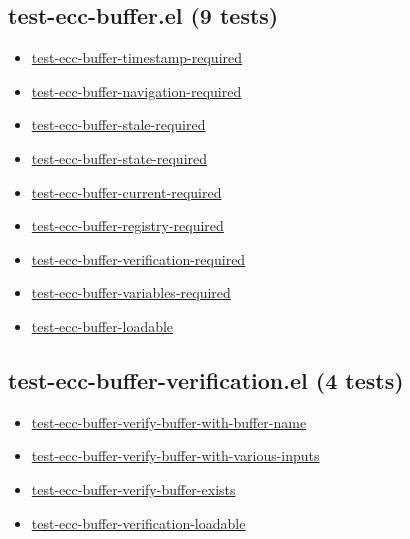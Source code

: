 \documentclass[11pt]{article}
\begin{document}
\subsection{test-ecc-buffer.el (9 tests)}
\label{sec:orgd9d5257}
\begin{itemize}
\item \href{test-ecc-buffer.el}{test-ecc-buffer-timestamp-required}
\item \href{test-ecc-buffer.el}{test-ecc-buffer-navigation-required}
\item \href{test-ecc-buffer.el}{test-ecc-buffer-stale-required}
\item \href{test-ecc-buffer.el}{test-ecc-buffer-state-required}
\item \href{test-ecc-buffer.el}{test-ecc-buffer-current-required}
\item \href{test-ecc-buffer.el}{test-ecc-buffer-registry-required}
\item \href{test-ecc-buffer.el}{test-ecc-buffer-verification-required}
\item \href{test-ecc-buffer.el}{test-ecc-buffer-variables-required}
\item \href{test-ecc-buffer.el}{test-ecc-buffer-loadable}
\end{itemize}
\subsection{test-ecc-buffer-verification.el (4 tests)}
\label{sec:orgd2758d4}
\begin{itemize}
\item \href{test-ecc-buffer-verification.el}{test-ecc-buffer-verify-buffer-with-buffer-name}
\item \href{test-ecc-buffer-verification.el}{test-ecc-buffer-verify-buffer-with-various-inputs}
\item \href{test-ecc-buffer-verification.el}{test-ecc-buffer-verify-buffer-exists}
\item \href{test-ecc-buffer-verification.el}{test-ecc-buffer-verification-loadable}
\end{itemize}
\end{document}
